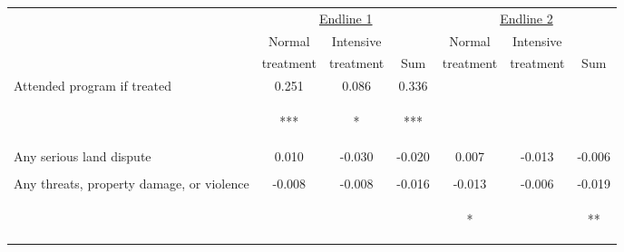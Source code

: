 \begin{tabular}{lcccccc}
\hline \noalign{\smallskip} & \multicolumn{3}{c}{\uline{\hfill Endline 1 \hfill}} & \multicolumn{3}{c}{\uline{\hfill Endline 2 \hfill}}\\
 & Normal & Intensive &  & Normal & Intensive & \\
 & treatment & treatment & Sum & treatment & treatment & Sum\\
\noalign{\smallskip}\hline \noalign{\smallskip}Attended program if treated & 0.251 & 0.086 & 0.336 &  &  & \\
 & \begin{footnotesize}[0.023]***\end{footnotesize} & \begin{footnotesize}[0.045]*\end{footnotesize} & \begin{footnotesize}[0.040]***\end{footnotesize} & \begin{footnotesize}\end{footnotesize} & \begin{footnotesize}\end{footnotesize} & \begin{footnotesize}\end{footnotesize}\\
\noalign{\smallskip}Any serious land dispute & 0.010 & -0.030 & -0.020 & 0.007 & -0.013 & -0.006\\
 & \begin{footnotesize}[0.018]\end{footnotesize} & \begin{footnotesize}[0.030]\end{footnotesize} & \begin{footnotesize}[0.028]\end{footnotesize} & \begin{footnotesize}[0.012]\end{footnotesize} & \begin{footnotesize}[0.016]\end{footnotesize} & \begin{footnotesize}[0.014]\end{footnotesize}\\
\noalign{\smallskip}Any threats, property damage, or violence & -0.008 & -0.008 & -0.016 & -0.013 & -0.006 & -0.019\\
 & \begin{footnotesize}[0.013]\end{footnotesize} & \begin{footnotesize}[0.021]\end{footnotesize} & \begin{footnotesize}[0.019]\end{footnotesize} & \begin{footnotesize}[0.007]*\end{footnotesize} & \begin{footnotesize}[0.009]\end{footnotesize} & \begin{footnotesize}[0.007]**\end{footnotesize}\\

\end{tabular}
